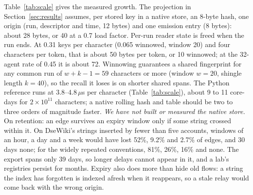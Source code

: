  Table~\ref{tab:scale} gives the measured growth. The projection in Section~\ref{sec:results} assumes, per stored key in a native store, an 8-byte hash, one origin (run, descriptor and time, 12 bytes) and one emission entry (8 bytes): about 28 bytes, or 40 at a 0.7 load factor. Per-run reader state is freed when the run ends. At 0.31 keys per character (0.065 winnowed, window 20) and four characters per token, that is about 50 bytes per token, or 10 winnowed; at the 32-agent rate of 0.45 it is about 72. Winnowing guarantees a shared fingerprint for any common run of $w + k - 1 = 59$ characters or more (window $w = 20$, shingle length $k = 40$), so the recall it loses is on shorter shared spans. The Python reference runs at 3.8--4.8\,$\mu$s per character (Table~\ref{tab:scale}), about 9 to 11 core-days for $2 \times 10^{11}$ characters; a native rolling hash and table should be two to three orders of magnitude faster. \emph{We have not built or measured the native store.} On retention: an edge survives an expiry window only if some string crossed within it. On DseWiki's strings inserted by fewer than five accounts, windows of an hour, a day and a week would have lost 52\%, 9.2\% and 2.7\% of edges, and 30 days none; for the widely repeated conventions, 81\%, 26\%, 16\% and none. The export spans only 39 days, so longer delays cannot appear in it, and a lab's registries persist for months. Expiry also does more than hide old flows: a string the index has forgotten is indexed afresh when it reappears, so a stale relay would come back with the wrong origin.
